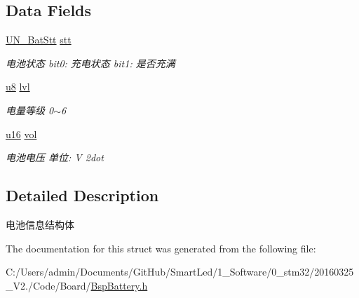 \subsection*{\-Data \-Fields}
\begin{DoxyCompactItemize}
\item 
\hypertarget{struct_s_t_r___b_a_t_t_e_r_y_a6055612f6fb11b95727b3641b73a469e}{\hyperlink{union_u_n___bat_stt}{\-U\-N\-\_\-\-Bat\-Stt} \hyperlink{struct_s_t_r___b_a_t_t_e_r_y_a6055612f6fb11b95727b3641b73a469e}{stt}}\label{struct_s_t_r___b_a_t_t_e_r_y_a6055612f6fb11b95727b3641b73a469e}

\begin{DoxyCompactList}\small\item\em 电池状态 bit0\-: 充电状态 bit1\-: 是否充满 \end{DoxyCompactList}\item 
\hypertarget{struct_s_t_r___b_a_t_t_e_r_y_a5e0dbf40a4ddaa1fd67a6b11092de0bf}{\hyperlink{group___b_s_p_gaed742c436da53c1080638ce6ef7d13de}{u8} \hyperlink{struct_s_t_r___b_a_t_t_e_r_y_a5e0dbf40a4ddaa1fd67a6b11092de0bf}{lvl}}\label{struct_s_t_r___b_a_t_t_e_r_y_a5e0dbf40a4ddaa1fd67a6b11092de0bf}

\begin{DoxyCompactList}\small\item\em 电量等级 0$\sim$6 \end{DoxyCompactList}\item 
\hypertarget{struct_s_t_r___b_a_t_t_e_r_y_a3240a8b8d7943569e983257915b3a2ef}{\hyperlink{group___b_s_p_ga9e6c91d77e24643b888dbd1a1a590054}{u16} \hyperlink{struct_s_t_r___b_a_t_t_e_r_y_a3240a8b8d7943569e983257915b3a2ef}{vol}}\label{struct_s_t_r___b_a_t_t_e_r_y_a3240a8b8d7943569e983257915b3a2ef}

\begin{DoxyCompactList}\small\item\em 电池电压 单位\-: \-V 2dot \end{DoxyCompactList}\end{DoxyCompactItemize}


\subsection{\-Detailed \-Description}
电池信息结构体 

\-The documentation for this struct was generated from the following file\-:\begin{DoxyCompactItemize}
\item 
\-C\-:/\-Users/admin/\-Documents/\-Git\-Hub/\-Smart\-Led/1\-\_\-\-Software/0\-\_\-stm32/20160325\-\_\-\-V2./\-Code/\-Board/\hyperlink{_bsp_battery_8h}{\-Bsp\-Battery.\-h}\end{DoxyCompactItemize}
